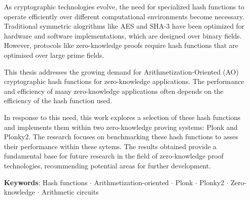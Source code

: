 \documentclass[draft,final]{vutinfth} %
\begin{document}
\frontmatter %


\begin{abstract*}
As cryptographic technologies evolve, the need for specialized hash functions to operate efficiently over different computational environments become necessary. Traditional symmetric alogrithms like AES and SHA-3 have been optimized for hardware and software implementations, which are designed over binary fields. However, protocols like zero-knowledge proofs require hash functions that are optimised over large prime fields.

This thesis addresses the growing demand for Arithmetization-Oriented (AO) cryptographic hash functions for zero-knowledge applications. The performance and efficiency of many zero-knowledge applications often depends on the efficiency of the hash function used.

In response to this need, this work explores a selection of these hash functions and implements them within two zero-knowledge proving systems: Plonk and Plonky2. The research focuses on benchmarking these hash functions to asses their performance within these sytems. The results obtained provide a fundamental base for future research in the field of zero-knowledge proof technologies, recommending potential areas for further development.

\textbf{Keywords}: Hash functions $\cdot$ Arithmetization-oriented $\cdot$ Plonk $\cdot$ Plonky2 $\cdot$ Zero-knowledge $\cdot$ Arithmetic circuits
\end{abstract*}
\end{document}
